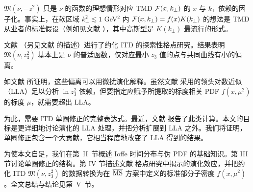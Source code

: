 ${\mathfrak M} (\nu, -z^2)$ 只是 $\nu$ 的函数的理想情形对应 TMD ${\cal F} (x, k_\perp)$ 的 $x$ 与 $k_\perp$ 依赖的因子化。事实上，在软区域 $k_\perp^2 \lesssim 1$ GeV$^2$ 内 ${\cal F} (x, k_\perp) = f(x) K(k_\perp)$ 的想法是 TMD 从业者的标准假设（例如见文献 \cite{Anselmino:2013lza}），其中高斯型是 $K(k_\perp)$ 最流行的形式。

文献 \cite{Orginos:2017kos}（另见文献 \cite{Karpie:2017bzm} 的描述）进行了约化 ITD 的探索性格点研究。结果表明 ${\mathfrak M} (\nu, z_3^2)$ 基本上是 $\nu$ 的普适函数，仅对应最小 $z_3$ 值的点与共同曲线有小的偏离。

如文献 \cite{Orginos:2017kos} 所证明，这些偏离可以用微扰演化解释。虽然文献 \cite{Orginos:2017kos} 采用的领头对数近似（LLA）足以分析 $\ln z_3^2$ 依赖，但要指定应赋予所提取的标度相关 PDF $f(x,\mu^2)$ 的标度 $\mu$，就需要超出 LLA。

为此，需要 ITD 单圈修正的完整表达式。最近，文献 \cite{Ji:2017rah,Radyushkin:2017lvu} 报告了此类计算。本文的目标是更详细地讨论演化的 LLA 处理，并把分析扩展到 LLA 之外。我们将证明，单圈修正包含一个大贡献，它相当程度地改变了 LLA 得到的结果。

为使本文自足，我们在\mbox{第 II 节}概述 Ioffe 时间分布与伪 PDF 的基础知识。第 III 节讨论单圈修正的结构。第 IV 节描述文献 \cite{Orginos:2017kos} 格点研究中揭示的演化效应，并把约化 ITD ${\mathfrak M} (\nu, z_3^2)$ 的数据转换为在 $\overline{\rm MS}$ 方案中定义的标准部分子密度 $f(x,\mu^2)$。全文总结与结论见\mbox{第 V 节}。
